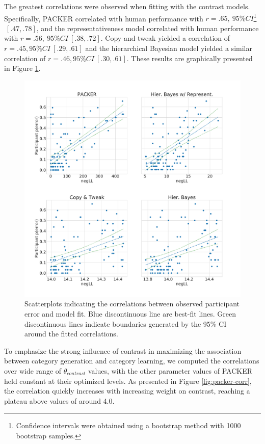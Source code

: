 The greatest correlations were observed when fitting with the contrast models.
Specifically, PACKER correlated with human performance with
$r = .65, \ 95\% CI$\footnote{Confidence intervals were obtained using a bootstrap
  method with 1000 bootstrap samples.}$ \ [.47,.78]$, and the representativeness
model correlated with human performance with $r = .56, \ 95\%  CI \ [.38, .72]$.
Copy-and-tweak yielded a correlation of $r = .45, 95\% CI \ [.29, .61]$ and the
hierarchical Bayesian model yielded a similar correlation of
$r = .46, 95\% CI \ [.30, .61]$. These results are graphically presented in Figure
\ref{fig:perror_corr}.

\begin{figure}
    \begin{center}
    \includegraphics[width=\textwidth]{figs/modelvspptp.pdf}
    \caption{Scatterplots indicating the correlations between observed
      participant error and model fit. Blue discontinuous line are best-fit
      lines. Green discontinuous lines indicate boundaries generated by the 95\%
      CI around the fitted correlations. }
    \label{fig:perror_corr}
    \end{center}
\end{figure}

To emphasize the strong influence of contrast in maximizing the association
between category generation and category learning, we computed the correlations
over wide range of $\theta_{contrast}$ values, with the other parameter values
of PACKER held constant at their optimized levels. As presented in Figure
\ref{fig:packer-corr}, the correlation quickly increases with increasing weight
on contrast, reaching a plateau above values of around 4.0.

